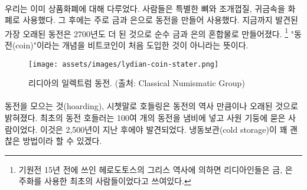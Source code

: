 \paragraph{}
\begin{comment}
	We already touched on commodity money above. People used special bones,
	seashells, and precious metals as money. Later on, mainly coins made out of
	precious metals like gold and silver were used as money. The oldest coin found
	so far is made of a natural gold-and-silver mix and was made more than 2700
	years ago.\footnote{According to the Greek historian Herodotus, writing in the
		fifth century BC, the Lydians were the first people to have used gold and silver
		coinage. \cite{coinage-origins}} If something is new in Bitcoin, the concept of
	a coin is not it.
\end{comment}
우리는 이미 상품화폐에 대해 다루었다. 
사람들은 특별한 뼈와 조개껍질, 귀금속을 화폐로 사용했다. 
그 후에는 주로 금과 은으로 동전을 만들어 사용했다.
지금까지 발견된 가장 오래된 동전은 2700년도 더 된 것으로 순수 금과 은의 혼합물로 만들어졌다. \footnote{기원전 15년 전에 쓰인 헤로도토스의 그리스 역사에 의하면 리디아인들은 금, 은 주화를 사용한 최초의 사람들이었다고 쓰여있다.\cite{coinage-origins}}
"동전(coin)"이라는 개념을 비트코인이 처음 도입한 것이 아니라는 뜻이다.

\newpage

\begin{figure}
	\centering
	\texttt{[image: assets/images/lydian-coin-stater.png]}
	\caption{리디아의 일렉트럼 동전. (출처: Classical Numismatic Group)}
	\label{fig:lydian-coin-stater}
\end{figure}

\paragraph{}
\begin{comment}
	Turns out that hoarding coins, or hodling, to use today's parlance, is
	almost as old as coins. The earliest coin hodler was someone who put
	almost a hundred of these coins in a pot and buried it in the
	foundations of a temple, only to be found 2500 years later. Pretty good
	cold storage if you ask me.
\end{comment}
동전을 모으는 것(hoarding), 시쳇말로 호들링은 동전의 역사 만큼이나 오래된 것으로 밝혀졌다. 
최초의 동전 호들러는 100여 개의 동전을 냄비에 넣고 사원 기둥에 묻은 사람이었다. 
이것은 2,500년이 지난 후에야 발견되었다. 냉동보관(cold storage)이 꽤 괜찮은 방법이라 할 수 있겠다.

